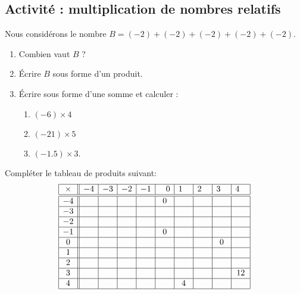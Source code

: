 
\subsection*{Activité : multiplication de nombres relatifs}

Nous considérons le nombre \( B=(-2)+(-2)+(-2)+(-2)+(-2)\).

\begin{enumerate}
    \item
        Combien vaut \( B\) ?
    \item
        Écrire \( B\) sous forme d'un produit.
    \item
        Écrire sous forme d'une somme et calculer :
        \begin{enumerate}
            \item \( (-6)\times 4\)
            \item \( (-21)\times 5\)
            \item\( (-1.5)\times 3\).
        \end{enumerate}
\end{enumerate}

Compléter le tableau de produits suivant:
\begin{equation*}
    \begin{array}[]{|c||c|c|c|c|c|c|c|c|c|}
        \hline
        \times&-4&-3&-2&-1&\hphantom{-}0&1\hphantom{-}&2\hphantom{-}&3\hphantom{-}&4\hphantom{-}\\
        \hline\hline
        -4&&&&&0&&&&\\
        \hline
        -3&&&&&&&&&\\
        \hline
        -2&&&&&&&&&\\
        \hline
        -1&&&&&0&&&&\\
        \hline
        0&&&&&&&&0&\\
        \hline
        1&&&&&&&&&\\
        \hline
        2&&&&&&&&&\\
        \hline
        3&&&&&&&&&12\\
        \hline
        4&&&&&&4&&&\\
        \hline
    \end{array}
\end{equation*}
